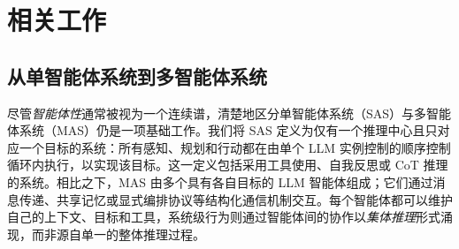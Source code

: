 


\section{相关工作}
\label{sec.related_work}


\begin{table}[t]
\centering
\addtolength{\tabcolsep}{-0.3em}
\caption{主流自动化 MAS 方法对比。
}
\label{tab:method_comparison}
\vspace{-2\baselineskip}
\end{table}

\subsection{从单智能体系统到多智能体系统}
尽管\textit{智能体性}通常被视为一个连续谱\cite{kapoor2024ai}，清楚地区分单智能体系统（SAS）与多智能体系统（MAS）仍是一项基础工作。我们将 SAS 定义为仅有一个推理中心且只对应一个目标的系统：所有感知、规划和行动都在由单个 LLM 实例控制的顺序控制循环内执行，以实现该目标。这一定义包括采用工具使用\citep{yao2023react}、自我反思\citep{madaan2024self}或 CoT 推理的系统。相比之下，MAS 由多个具有各自目标的 LLM 智能体组成；它们通过消息传递、共享记忆或显式编排协议等结构化通信机制交互\citep{xi2023risepotentiallargelanguage}。每个智能体都可以维护自己的上下文、目标和工具，系统级行为则通过智能体间的协作以\emph{集体推理}形式涌现，而非源自单一的整体推理过程。

